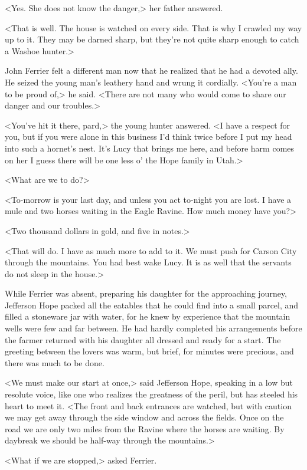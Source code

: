 <Yes. She does not know the danger,> her father answered.

<That is well. The house is watched on every side. That is why I crawled my way up to it. They may be darned sharp, but they're not quite sharp enough to catch a Washoe hunter.>

John Ferrier felt a different man now that he realized that he had a devoted ally. He seized the young man's leathery hand and wrung it cordially. <You're a man to be proud of,> he said. <There are not many who would come to share our danger and our troubles.>

<You've hit it there, pard,> the young hunter answered. <I have a respect for you, but if you were alone in this business I'd think twice before I put my head into such a hornet's nest. It's Lucy that brings me here, and before harm comes on her I guess there will be one less o' the Hope family in Utah.>

<What are we to do?>

<To-morrow is your last day, and unless you act to-night you are lost. I have a mule and two horses waiting in the Eagle Ravine. How much money have you?>

<Two thousand dollars in gold, and five in notes.>

<That will do. I have as much more to add to it. We must push for Carson City through the mountains. You had best wake Lucy. It is as well that the servants do not sleep in the house.>

While Ferrier was absent, preparing his daughter for the approaching journey, Jefferson Hope packed all the eatables that he could find into a small parcel, and filled a stoneware jar with water, for he knew by experience that the mountain wells were few and far between. He had hardly completed his arrangements before the farmer returned with his daughter all dressed and ready for a start. The greeting between the lovers was warm, but brief, for minutes were precious, and there was much to be done.

<We must make our start at once,> said Jefferson Hope, speaking in a low but resolute voice, like one who realizes the greatness of the peril, but has steeled his heart to meet it. <The front and back entrances are watched, but with caution we may get away through the side window and across the fields. Once on the road we are only two miles from the Ravine where the horses are waiting. By daybreak we should be half-way through the mountains.>

<What if we are stopped,> asked Ferrier.

